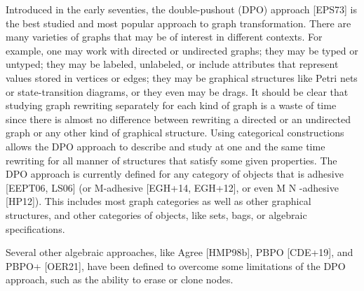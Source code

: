 Introduced in the early seventies, the double-pushout (DPO) approach [EPS73] is the best studied and most popular approach to graph transformation. There are many varieties of graphs that may be of interest in different contexts. For example, one may work with directed or undirected graphs; they may be typed or untyped; they may be labeled, unlabeled, or include attributes that represent values stored in vertices or edges; they may be graphical structures like Petri nets or state-transition diagrams, or they even may be drags. It should be clear that studying graph rewriting separately for each kind of graph is a waste of time since there is almost no difference between rewriting a directed or an undirected graph or any other kind of graphical structure. Using categorical constructions allows the DPO approach to describe and study at one and the same time rewriting for all manner of structures that satisfy some given properties. The DPO approach is currently defined for any category of objects that is adhesive [EEPT06, LS06] (or M-adhesive [EGH+14, EGH+12], or even M N -adhesive [HP12]). This includes most graph categories as well as other graphical structures, and other categories of objects, like sets, bags, or algebraic specifications. 



Several other algebraic approaches, like Agree [HMP98b], PBPO [CDE+19], and PBPO+ [OER21], have been defined to overcome some limitations of the DPO approach, such as the ability to erase or clone nodes.


